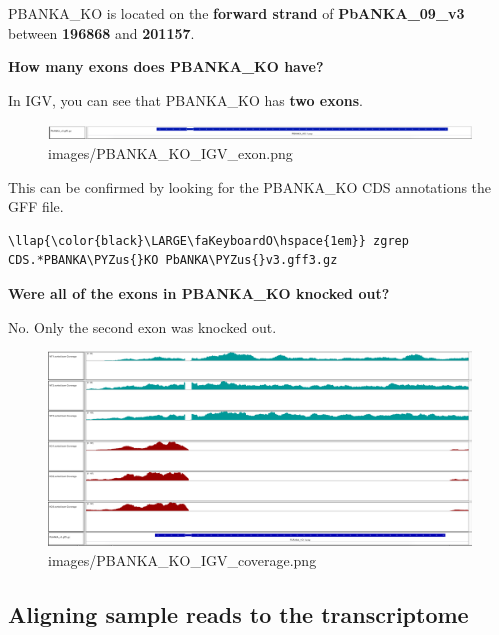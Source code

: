 \documentclass[11pt]{article}
\makeatletter
\def\maxwidth{\ifdim\Gin@nat@width>\linewidth\linewidth
    \else\Gin@nat@width\fi}
\let\Oldincludegraphics\includegraphics
\renewcommand{\includegraphics}[1]{\Oldincludegraphics[width=.8\maxwidth, height=.55\textheight, keepaspectratio]{#1}}
\def\PYZus{\char`\_}
\makeatother
\begin{document}
    PBANKA\_KO is located on the \textbf{forward strand} of
\textbf{PbANKA\_09\_v3} between \textbf{196868} and \textbf{201157}.

    \textbf{How many exons does PBANKA\_KO have?}

In IGV, you can see that PBANKA\_KO has \textbf{two exons}.

    \begin{figure}[!h]
\centering
\includegraphics{images/PBANKA_KO_IGV_exon.png}
\caption{images/PBANKA\_KO\_IGV\_exon.png}
\end{figure}

    This can be confirmed by looking for the PBANKA\_KO CDS annotations the
GFF file.

\begin{terminalinput}
\begin{Verbatim}[commandchars=\\\{\}]
\llap{\color{black}\LARGE\faKeyboardO\hspace{1em}} zgrep CDS.*PBANKA\PYZus{}KO PbANKA\PYZus{}v3.gff3.gz
\end{Verbatim}
\end{terminalinput}


    \textbf{Were all of the exons in PBANKA\_KO knocked out?}

No. Only the second exon was knocked out.

    \begin{figure}[!h]
\centering
\includegraphics{images/PBANKA_KO_IGV_coverage.png}
\caption{images/PBANKA\_KO\_IGV\_coverage.png}
\end{figure}

\newpage

    \subsection{Aligning sample reads to the
transcriptome}\label{aligning-sample-reads-to-the-transcriptome}
\end{document}
